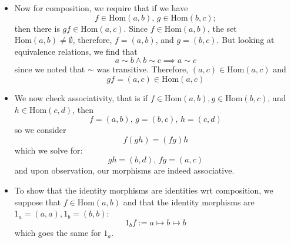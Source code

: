 \documentclass{report}
\begin{document}
\begin{examples}
\begin{example}[\label{exm:1.3.3}]
\begin{itemize}
            \item Now for composition, we require that if we have 
                \begin{equation*}
                    f \in \text{Hom}(a, b), \, g \in \text{Hom}(b, c);
                \end{equation*}
                then there is $gf \in \text{Hom}(a, c)$. Since $f \in \text{Hom}(a, b)$, the set $\text{Hom}(a, b) \neq \emptyset$, therefore, $f = (a, b)$, and $g = (b, c)$. But looking at equivalence relations, we find that
                \begin{equation*}
                    a \sim b \land b \sim c \implies a \sim c
                \end{equation*}
                since we noted that $\sim $ was transitive. Therefore, $(a, c) \in \text{Hom}(a, c)$ and
                \begin{equation*}
                    gf = (a, c) \in \text{Hom}(a, c)
                \end{equation*}

            \item We now check associativity, that is if $f \in \text{Hom}(a, b), g \in \text{Hom}(b, c)$, and $h \in \text{Hom}(c, d)$, then
                \begin{equation*}
                    f = (a, b), \, g = (b, c), \, h = (c, d)
                \end{equation*}
                so we consider
                \begin{equation*}
                    f(gh) = (fg)h
                \end{equation*}
                which we solve for:
                \begin{equation*}
                    gh = (b, d), \, fg = (a, c)
                \end{equation*}
                and upon observation, our morphisms are indeed associative.

            \item To show that the identity morphisms are identities wrt composition, we suppose that $f \in \text{Hom}(a, b)$ and that the identity morphisms are $1_{a} = (a, a), 1_{b} = (b, b)$:
                \begin{equation*}
                    1_{b}f := a \mapsto b \mapsto b
                \end{equation*}
                which goes the same for $1_{a}$. 
        \end{itemize}


\end{example}
\end{examples}
\end{document}
